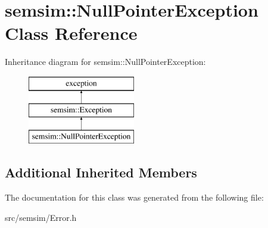 \hypertarget{classsemsim_1_1NullPointerException}{}\section{semsim\+:\+:Null\+Pointer\+Exception Class Reference}
\label{classsemsim_1_1NullPointerException}
Inheritance diagram for semsim\+:\+:Null\+Pointer\+Exception\+:\begin{figure}[H]
\begin{center}
\leavevmode
\includegraphics[height=3.000000cm]{classsemsim_1_1NullPointerException}
\end{center}
\end{figure}
\subsection*{Additional Inherited Members}


The documentation for this class was generated from the following file\+:\begin{DoxyCompactItemize}
\item 
src/semsim/Error.\+h\end{DoxyCompactItemize}
